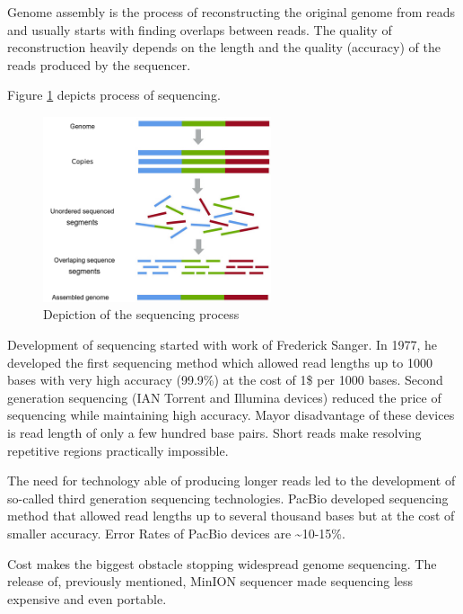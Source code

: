 \documentclass[times, utf8, diplomski, numeric, english]{fer}
\begin{document}
Genome assembly is the process of reconstructing the original genome from reads and usually starts with finding overlaps between reads.
The quality of reconstruction heavily depends on the length and the quality (accuracy) of the reads produced by the sequencer.

Figure \ref{fg:sequencing} depicts process of sequencing.

\begin{figure}[!ht]
	\begin{center}
		\includegraphics[width=0.6\textwidth]{./imgs/sequencing.png}
		\caption{Depiction of the sequencing process}
		\label{fg:sequencing}
	\end{center}
\end{figure}


Development of sequencing started with work of Frederick Sanger\cite{mile}\cite{Pettersson2009}. In 1977, he developed the first sequencing method which allowed 
read lengths up to 1000 bases with very high accuracy (99.9\%) at the cost of 1\$ per 1000 bases.
Second generation sequencing (IAN Torrent and Illumina devices) reduced the price of sequencing while maintaining high accuracy. Mayor disadvantage of these devices is read length of only a few hundred base pairs. Short reads make resolving repetitive regions practically impossible.

The need for technology able of producing longer reads led to the development of so-called third generation sequencing technologies.
PacBio developed sequencing method that allowed read lengths up to several thousand bases but at the cost of smaller accuracy. Error Rates of PacBio devices are \textasciitilde10-15\%. 

Cost makes the biggest obstacle stopping widespread genome sequencing. The release of, previously mentioned, MinION sequencer made sequencing less expensive and even portable.
\end{document}
